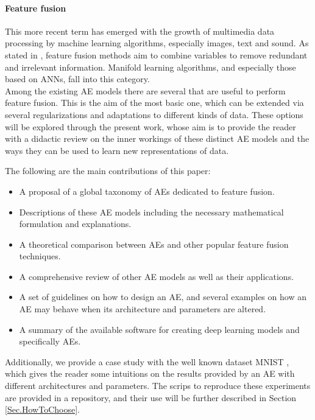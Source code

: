     \paragraph{Feature fusion \cite{FeatureFusion}}
    This more recent term has emerged with the growth of multimedia data processing by machine learning algorithms, especially images, text and sound. As stated in \cite{FeatureFusion}, feature fusion methods aim to combine variables to remove redundant and irrelevant information. Manifold learning algorithms, and especially those based on ANNs, fall into this category. \\

    Among the existing AE models there are several that are useful to perform feature fusion. This is the aim of the most basic one, which can be extended via several regularizations and adaptations to different kinds of data. These options will be explored through the present work, whose aim is to provide the reader with a didactic review on the inner workings of these distinct AE models and the ways they can be used to learn new representations of data.

    The following are the main contributions of this paper:
    \begin{itemize}
	    \item A proposal of a global taxonomy of AEs dedicated to feature fusion.
	
	    \item Descriptions of these AE models including the necessary mathematical formulation and explanations.
	
	    \item A theoretical comparison between AEs and other popular feature fusion techniques.
	    
	    \item A comprehensive review of other AE models as well as their applications.
	      
	    \item A set of guidelines on how to design an AE, and several examples on how an AE may behave when its architecture and parameters are altered.

            \item A summary of the available software for creating deep learning models and specifically AEs.
    \end{itemize}

    Additionally, we provide a case study with the well known dataset MNIST \cite{MNIST}, which gives the reader some intuitions on the results provided by an AE with different architectures and parameters. The scrips to reproduce these experiments are provided in a repository, and their use will be further described in Section \ref{Sec.HowToChoose}.

